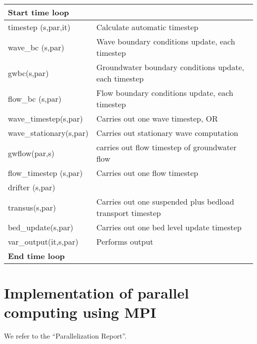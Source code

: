 \begin{tabular}{|p{1.7in}|p{2.2in}|} \hline 
\multicolumn{2}{|p{1in}|}{\textbf{Start time loop}} \\ \hline 
timestep (s,par,it) & Calculate automatic timestep \\ \hline 
wave\_bc (s,par) & Wave boundary conditions update, each timestep \\ \hline 
gwbc(s,par) & Groundwater boundary conditions update, each timestep \\ \hline 
flow\_bc (s,par) & Flow boundary conditions update, each timestep \\ \hline 
wave\_timestep(s,par) & Carries out one wave timestep, OR \\ \hline 
wave\_stationary(s,par) & Carries out stationary wave computation \\ \hline 
gwflow(par,s) & carries out flow timestep of groundwater flow \\ \hline 
flow\_timestep (s,par) & Carries out one flow timestep \\ \hline 
drifter (s,par) &  \\ \hline 
transus(s,par) & Carries out one suspended plus bedload transport timestep \\ \hline 
bed\_update(s,par) & Carries out one bed level update timestep \\ \hline 
var\_output(it,s,par) & Performs output \\ \hline 
\textbf{End time loop} &  \\ \hline 
\end{tabular}
\section{ Implementation of parallel computing using MPI}

We refer to the ``Parallelization Report''.

